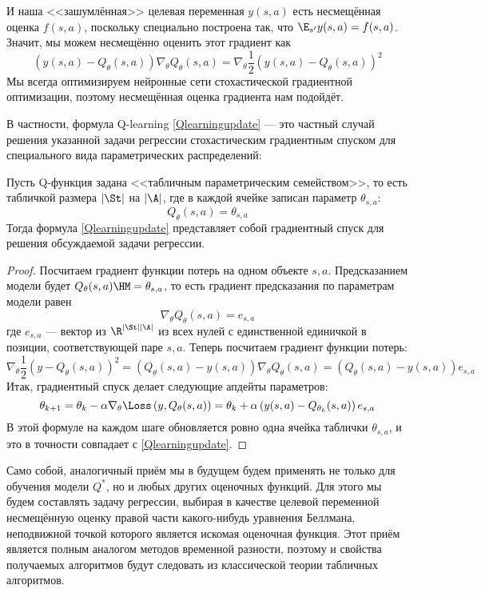 И наша <<зашумлённая>> целевая переменная $y(s, a)$ есть несмещённая оценка $f(s, a)$, поскольку специально построена так, что $\E_{s'} y(s, a) = f(s, a)$. Значит, мы можем несмещённо оценить этот градиент как 
\begin{equation}\label{DQNgradient}
(y(s, a) - Q_{\theta}(s, a))\nabla_\theta Q_{\theta}(s, a) = \nabla_\theta \frac{1}{2} \left( y(s, a) - Q_{\theta}(s, a) \right)^2
\end{equation}
Мы всегда оптимизируем нейронные сети стохастической градиентной оптимизации, поэтому несмещённая оценка градиента нам подойдёт.

В частности, формула Q-learning \eqref{Qlearningupdate} --- это частный случай решения указанной задачи регрессии стохастическим градиентным спуском для специального вида параметрических распределений:

\begin{theorem}
Пусть Q-функция задана <<табличным параметрическим семейством>>, то есть табличкой размера $|\St|$ на $|\A|$, где в каждой ячейке записан параметр $\theta_{s, a}$:
$$Q_{\theta}(s, a) = \theta_{s, a}$$
Тогда формула \eqref{Qlearningupdate} представляет собой градиентный спуск для решения обсуждаемой задачи регрессии.

\begin{proof}
Посчитаем градиент функции потерь на одном объекте $s, a$. Предсказанием модели будет $Q_{\theta}(s, a) \HM= \theta_{s, a}$, то есть градиент предсказания по параметрам модели равен
$$\nabla_\theta Q_{\theta}(s, a) = e_{s, a}$$
где $e_{s, a}$ --- вектор из $\R^{|\St| |\A|}$ из всех нулей с единственной единичкой в позиции, соответствующей паре $s, a$. Теперь посчитаем градиент функции потерь:
$$\nabla_\theta \frac{1}{2} \left( y - Q_{\theta}(s, a) \right)^2 = \left( Q_{\theta}(s, a) - y(s, a) \right) \nabla_\theta Q_{\theta}(s, a) = \left( Q_{\theta}(s, a) - y(s, a) \right) e_{s, a}$$
Итак, градиентный спуск делает следующие апдейты параметров:
$$\theta_{k+1} = \theta_k - \alpha \nabla_\theta \Loss \left( y, Q_{\theta}(s, a) \right) = \theta_k + \alpha \left( y(s, a) - Q_{\theta_k}(s, a) \right) e_{s, a}$$
В этой формуле на каждом шаге обновляется ровно одна ячейка таблички $\theta_{s, a}$, и это в точности совпадает с \eqref{Qlearningupdate}.
\end{proof}
\end{theorem}

Само собой, аналогичный приём мы в будущем будем применять не только для обучения модели $Q^*$, но и любых других оценочных функций. Для этого мы будем составлять задачу регрессии, выбирая в качестве целевой переменной несмещённую оценку правой части какого-нибудь уравнения Беллмана, неподвижной точкой которого является искомая оценочная функция. Этот приём является полным аналогом методов временной разности, поэтому и свойства получаемых алгоритмов будут следовать из классической теории табличных алгоритмов. 

